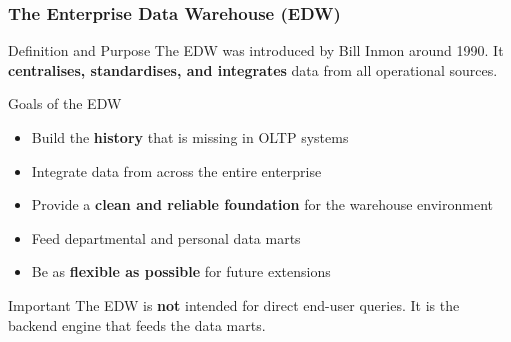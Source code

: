 \begin{frame}
  \frametitle{The Enterprise Data Warehouse (EDW)}

  \begin{block}{Definition and Purpose}
    The EDW was introduced by Bill Inmon around 1990.
    It \textbf{centralises, standardises, and integrates} data from all
    operational sources.
  \end{block}

  \begin{block}{Goals of the EDW}
    \begin{itemize}
      \item Build the \textbf{history} that is missing in OLTP systems
      \item Integrate data from across the entire enterprise
      \item Provide a \textbf{clean and reliable foundation} for the warehouse environment
      \item Feed departmental and personal data marts
      \item Be as \textbf{flexible as possible} for future extensions
    \end{itemize}
  \end{block}

  \begin{alertblock}{Important}
    The EDW is \textbf{not} intended for direct end-user queries.
    It is the backend engine that feeds the data marts.
  \end{alertblock}
\end{frame}


